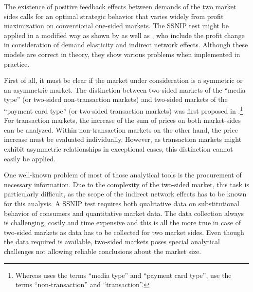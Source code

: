 \documentclass[10pt,a4paper]{scrreprt}
\begin{document}
The existence of positive feedback effects between demands of the two market sides calls for an optimal strategic behavior that varies widely from profit maximization on conventional one-sided markets. The SSNIP test might be applied in a modified way as shown by \cite{filistrucchi_market_2013} as well as \cite{evans_defining_2007}, who include the profit change in consideration of demand elasticity and indirect network effects. Although these models are correct in theory, they show various problems when implemented in practice. 

First of all, it must be clear if the market under consideration is a symmetric or an asymmetric market. The distinction between two-sided markets of the “media type” (or two-sided non-transaction markets) and two-sided markets of the “payment card type” (or two-sided transaction markets) was first proposed in \cite{filistrucchi_ssnip_2008}.\footnote{Whereas \cite{filistrucchi_ssnip_2008} uses the terms “media type” and “payment card type”, \cite{filistrucchi_market_2013} use the terms “non-transaction” and “transaction”.} For transaction markets, the increase of the sum of prices on both market-sides can be analyzed. Within non-transaction markets on the other hand, the price increase must be evaluated individually. However, as transaction markets might exhibit asymmetric relationships in exceptional cases, this distinction cannot easily be applied. 

One well-known problem of most of those analytical tools is the procurement of necessary information. Due to the complexity of the two-sided market, this task is particularly difficult, as the scope of the indirect network effects has to be known for this analysis. A SSNIP test requires both qualitative data on substitutional behavior of consumers and quantitative market data. The data collection always is challenging, costly and time expensive and this is all the more true in case of two-sided markets as data has to be collected for two market sides. Even though the data required is available, two-sided markets poses special analytical challenges not allowing reliable conclusions about the market size. 
\end{document}
